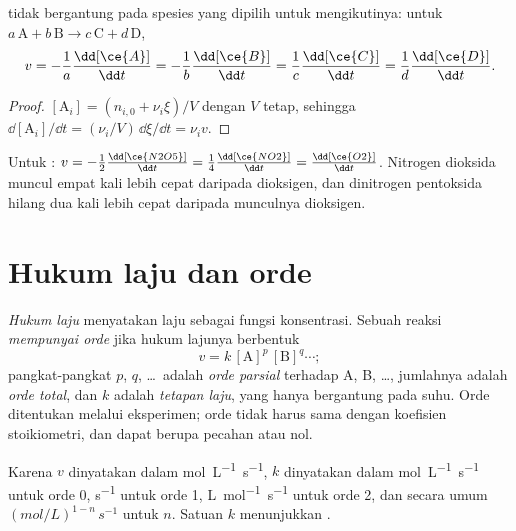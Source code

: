 \begin{proposition}\label{prop:b1:rate-laws:rate-relations}
 tidak bergantung pada spesies yang dipilih untuk mengikutinya:
untuk $a\,\mathrm{A} + b\,\mathrm{B} \longrightarrow c\,\mathrm{C} + d\,\mathrm{D}$,
\[
  v = -\frac1a\frac{\dd[\ce{A}]}{\dd t} = -\frac1b\frac{\dd[\ce{B}]}{\dd t}
  = \frac1c\frac{\dd[\ce{C}]}{\dd t} = \frac1d\frac{\dd[\ce{D}]}{\dd t} .
\]
\end{proposition}

\begin{proof}
$[\mathrm{A}_i] = (n_{i,0} + \nu_i\xi)/V$ dengan $V$ tetap, sehingga
$\dd[\mathrm{A}_i]/\dd t = (\nu_i/V)\,\dd\xi/\dd t = \nu_i v$.
\end{proof}

\begin{example}\label{ex:b1:rate-laws:n2o5}
Untuk : $v = -\frac12\frac{\dd[\ce{N2O5}]}{\dd t} =
\frac14\frac{\dd[\ce{NO2}]}{\dd t} = \frac{\dd[\ce{O2}]}{\dd t}$. Nitrogen
dioksida muncul empat kali lebih cepat daripada dioksigen, dan dinitrogen
pentoksida hilang dua kali lebih cepat daripada munculnya dioksigen.
\end{example}

\section{Hukum laju dan orde}

\begin{definition}\label{def:b1:rate-laws:order}
\emph{Hukum laju} menyatakan laju sebagai fungsi
konsentrasi. Sebuah reaksi \emph{mempunyai orde} jika hukum lajunya
berbentuk
\[
  v = k\,[\mathrm{A}]^{p}\,[\mathrm{B}]^{q} \cdots ;
\]
pangkat-pangkat $p$, $q$, \dots\ adalah \emph{orde parsial}
terhadap A, B, \dots, jumlahnya adalah \emph{orde
total}, dan $k$ adalah \emph{tetapan laju},
yang hanya bergantung pada suhu. Orde ditentukan melalui eksperimen;
orde tidak harus sama dengan koefisien stoikiometri, dan dapat berupa
pecahan atau nol.
\end{definition}

\begin{remark}[Satuan $k$]\label{rem:b1:rate-laws:units}
Karena $v$ dinyatakan dalam \unit{mol.L^{-1}.s^{-1}}, $k$ dinyatakan dalam
\unit{mol.L^{-1}.s^{-1}} untuk orde 0, \unit{s^{-1}} untuk orde 1,
\unit{L.mol^{-1}.s^{-1}} untuk orde 2, dan secara umum
$(\unit{mol/L})^{1-n}\,\unit{s^{-1}}$ untuk  $n$. Satuan $k$
menunjukkan .
\end{remark}

